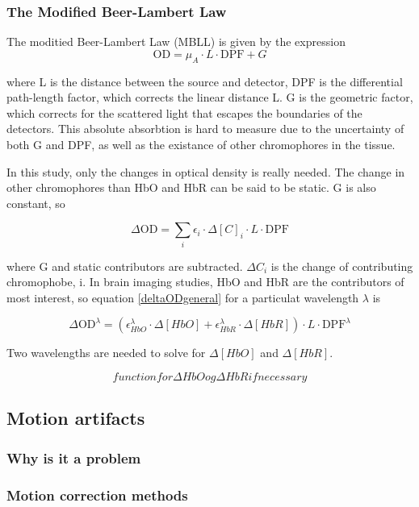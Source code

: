\subsubsection{The Modified Beer-Lambert Law}
The moditied Beer-Lambert Law (MBLL) is given by the expression
\begin{equation}
\text{OD}=\mu_A \cdot L \cdot \text{DPF} + G
\end{equation}

where L is the distance between the source and detector, DPF is the differential path-length factor, which corrects the linear distance L. G is the geometric factor, which corrects for the scattered light that escapes the boundaries of the detectors. This absolute absorbtion is hard to measure due to the uncertainty of both G and DPF, as well as the existance of other chromophores in the tissue.

In this study, only the changes in optical density is really needed. The change in other chromophores than HbO and HbR can be said to be static. G is also constant, so 

\begin{equation} \label{sec:deltaODgeneral}
\Delta\text{OD}=\displaystyle\sum_{i} \epsilon_i \cdot \Delta [C]_i \cdot L \cdot \text{DPF}
\end{equation}

where G and static contributors are subtracted. $\Delta C_i$ is the change of contributing chromophobe, i. In brain imaging studies, HbO and HbR are the contributors of most interest, so equation \ref{deltaODgeneral} for a particulat wavelength $\lambda$ is

\begin{equation}
\Delta\text{OD}^{\lambda}= (\epsilon_{HbO}^{\lambda} \cdot \Delta [HbO] + \epsilon_{HbR}^{\lambda} \cdot \Delta [HbR]) \cdot L \cdot \text{DPF}^{\lambda}
\end{equation}

Two wavelengths are needed to solve for $\Delta [HbO]$ and $\Delta [HbR]$.

\begin{equation}
function for \Delta HbO og \Delta HbR if necessary
\end{equation}





\subsection{Motion artifacts} \label{sec:motionArtifact}
\subsubsection{Why is it a problem}
\subsubsection{Motion correction methods}








